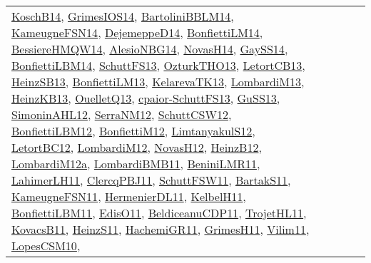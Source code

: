 {\begin{longtable}{lp{3cm}>{\raggedright}p{6cm}>{\raggedright}p{6cm}p{8cm}}
\href{papers/KoschB14.pdf}{KoschB14}\cite{KoschB14}, \href{articles/GrimesIOS14.pdf}{GrimesIOS14}\cite{GrimesIOS14}, \href{papers/BartoliniBBLM14.pdf}{BartoliniBBLM14}\cite{BartoliniBBLM14}, \href{articles/KameugneFSN14.pdf}{KameugneFSN14}\cite{KameugneFSN14}, \href{papers/DejemeppeD14.pdf}{DejemeppeD14}\cite{DejemeppeD14}, \href{papers/BonfiettiLM14.pdf}{BonfiettiLM14}\cite{BonfiettiLM14}, \href{papers/BessiereHMQW14.pdf}{BessiereHMQW14}\cite{BessiereHMQW14}, \href{papers/AlesioNBG14.pdf}{AlesioNBG14}\cite{AlesioNBG14}, \href{articles/NovasH14.pdf}{NovasH14}\cite{NovasH14}, \href{papers/GaySS14.pdf}{GaySS14}\cite{GaySS14}, \href{articles/BonfiettiLBM14.pdf}{BonfiettiLBM14}\cite{BonfiettiLBM14}, \href{papers/SchuttFS13.pdf}{SchuttFS13}\cite{SchuttFS13}, \href{articles/OzturkTHO13.pdf}{OzturkTHO13}\cite{OzturkTHO13}, \href{papers/LetortCB13.pdf}{LetortCB13}\cite{LetortCB13}, \href{articles/HeinzSB13.pdf}{HeinzSB13}\cite{HeinzSB13}, \href{papers/BonfiettiLM13.pdf}{BonfiettiLM13}\cite{BonfiettiLM13}, \href{papers/KelarevaTK13.pdf}{KelarevaTK13}\cite{KelarevaTK13}, \href{papers/LombardiM13.pdf}{LombardiM13}\cite{LombardiM13}, \href{papers/HeinzKB13.pdf}{HeinzKB13}\cite{HeinzKB13}, \href{papers/OuelletQ13.pdf}{OuelletQ13}\cite{OuelletQ13}, \href{papers/cpaior-SchuttFS13.pdf}{cpaior-SchuttFS13}\cite{cpaior-SchuttFS13}, \href{papers/GuSS13.pdf}{GuSS13}\cite{GuSS13}, \href{papers/SimoninAHL12.pdf}{SimoninAHL12}\cite{SimoninAHL12}, \href{papers/SerraNM12.pdf}{SerraNM12}\cite{SerraNM12}, \href{papers/SchuttCSW12.pdf}{SchuttCSW12}\cite{SchuttCSW12}, \href{papers/BonfiettiLBM12.pdf}{BonfiettiLBM12}\cite{BonfiettiLBM12}, \href{papers/BonfiettiM12.pdf}{BonfiettiM12}\cite{BonfiettiM12}, \href{articles/LimtanyakulS12.pdf}{LimtanyakulS12}\cite{LimtanyakulS12}, \href{papers/LetortBC12.pdf}{LetortBC12}\cite{LetortBC12}, \href{articles/LombardiM12.pdf}{LombardiM12}\cite{LombardiM12}, \href{articles/NovasH12.pdf}{NovasH12}\cite{NovasH12}, \href{papers/HeinzB12.pdf}{HeinzB12}\cite{HeinzB12}, \href{articles/LombardiM12a.pdf}{LombardiM12a}\cite{LombardiM12a}, \href{papers/LombardiBMB11.pdf}{LombardiBMB11}\cite{LombardiBMB11}, \href{articles/BeniniLMR11.pdf}{BeniniLMR11}\cite{BeniniLMR11}, \href{papers/LahimerLH11.pdf}{LahimerLH11}\cite{LahimerLH11}, \href{papers/ClercqPBJ11.pdf}{ClercqPBJ11}\cite{ClercqPBJ11}, \href{articles/SchuttFSW11.pdf}{SchuttFSW11}\cite{SchuttFSW11}, \href{articles/BartakS11.pdf}{BartakS11}\cite{BartakS11}, \href{papers/KameugneFSN11.pdf}{KameugneFSN11}\cite{KameugneFSN11}, \href{papers/HermenierDL11.pdf}{HermenierDL11}\cite{HermenierDL11}, \href{articles/KelbelH11.pdf}{KelbelH11}\cite{KelbelH11}, \href{papers/BonfiettiLBM11.pdf}{BonfiettiLBM11}\cite{BonfiettiLBM11}, \href{papers/EdisO11.pdf}{EdisO11}\cite{EdisO11}, \href{articles/BeldiceanuCDP11.pdf}{BeldiceanuCDP11}\cite{BeldiceanuCDP11}, \href{articles/TrojetHL11.pdf}{TrojetHL11}\cite{TrojetHL11}, \href{articles/KovacsB11.pdf}{KovacsB11}\cite{KovacsB11}, \href{papers/HeinzS11.pdf}{HeinzS11}\cite{HeinzS11}, \href{articles/HachemiGR11.pdf}{HachemiGR11}\cite{HachemiGR11}, \href{papers/GrimesH11.pdf}{GrimesH11}\cite{GrimesH11}, \href{papers/Vilim11.pdf}{Vilim11}\cite{Vilim11}, \href{articles/LopesCSM10.pdf}{LopesCSM10}\cite{LopesCSM10}, 
\end{longtable}}
